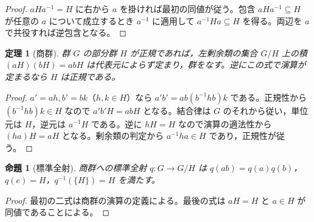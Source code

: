 \documentclass[a5paper,10pt,dvipdfmx]{jsarticle}
\theoremstyle{definition}
\theoremstyle{plain}
\newtheorem{prop}[ruledef]{命題}
\newtheorem{thm}[ruledef]{定理}
\begin{document}
\begin{proof}
$aHa^{-1}=H$ に右から $a$ を掛ければ最初の同値が従う。包含 $aHa^{-1}\subseteq H$ が任意の $a$ について成立するとき $a^{-1}$ に適用して $a^{-1}Ha\subseteq H$ を得る。両辺を $a$ で共役すれば逆包含となる。
\end{proof}
\begin{thm}[商群]\label{k267}
群 $G$ の部分群 $H$ が正規であれば，左剰余類の集合 $G/H$ 上の積 $(aH)(bH)=abH$ は代表元によらず定まり，群をなす。逆にこの式で演算が定まるなら $H$ は正規である。
\end{thm}
\begin{proof}
$a'=ah,b'=bk$（$h,k\in H$）なら $a'b'=ab(b^{-1}hb)k$ である。正規性から $(b^{-1}hb)k\in H$ なので $a'b'H=abH$ となる。結合律は $G$ のそれから従い，単位元は $H$，逆元は $a^{-1}H$ である。逆に $hH=H$ なので演算の適法性から $(ha)H=aH$ となる。剰余類の判定から $a^{-1}ha\in H$ であり，正規性が従う。
\end{proof}
\begin{prop}[標準全射]\label{k268}
商群への標準全射 $q\colon G\to G/H$ は $q(ab)=q(a)q(b)$，$q(e)=H$，$q^{-1}(\{H\})=H$ を満たす。
\end{prop}
\begin{proof}
最初の二式は商群の演算の定義による。最後の式は $aH=H$ と $a\in H$ が同値であることによる。
\end{proof}
\par\medskip{}
\end{document}
